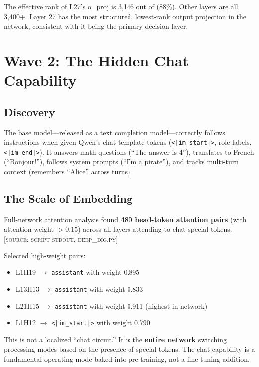 \documentclass[11pt,a4paper]{article}
\begin{document}
The effective rank of L27's o\_proj is 3,146 out of \dbHiddenSize{} (88\%). Other layers are all 3,400+. Layer 27 has the most structured, lowest-rank output projection in the network, consistent with it being the primary decision layer.

\section{Wave 2: The Hidden Chat Capability}

\subsection{Discovery}
The base model---released as a text completion model---correctly follows instructions when given Qwen's chat template tokens (\texttt{<|im\_start|>}, role labels, \texttt{<|im\_end|>}). It answers math questions (``The answer is 4''), translates to French (``Bonjour!''), follows system prompts (``I'm a pirate''), and tracks multi-turn context (remembers ``Alice'' across turns).

\subsection{The Scale of Embedding}
Full-network attention analysis found \textbf{480 head-token attention pairs} (with attention weight $>0.15$) across all \dbNLayers{} layers attending to chat special tokens. \textsc{[source: script stdout, deep\_dig.py]}

Selected high-weight pairs:
\begin{itemize}[nosep]
\item L1H19 $\rightarrow$ \texttt{assistant} with weight 0.895
\item L13H13 $\rightarrow$ \texttt{assistant} with weight 0.833
\item L21H15 $\rightarrow$ \texttt{assistant} with weight 0.911 (highest in network)
\item L1H12 $\rightarrow$ \texttt{<|im\_start|>} with weight 0.790
\end{itemize}

This is not a localized ``chat circuit.'' It is the \textbf{entire network} switching processing modes based on the presence of special tokens. The chat capability is a fundamental operating mode baked into pre-training, not a fine-tuning addition.
\end{document}
